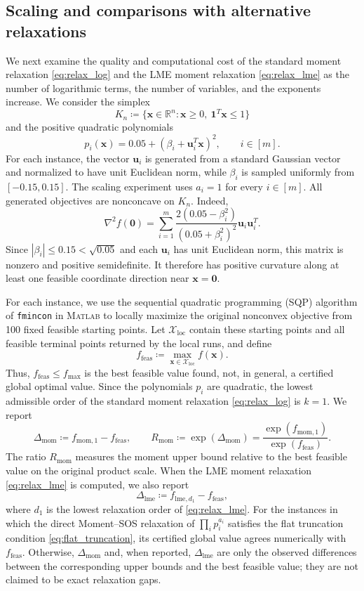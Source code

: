 \documentclass[pdflatex,sn-mathphys-num]{sn-jnl}%
\newcommand{\vect}[1]{\boldsymbol{#1}}
\theoremstyle{thmstyleone}%
\theoremstyle{thmstyletwo}%
\theoremstyle{thmstylethree}%
\begin{document}
{\color{red}
\subsection{Scaling and comparisons with alternative relaxations}
\label{sec:scaling}

We next examine the quality and computational cost of the standard
moment relaxation \eqref{eq:relax_log} and the LME moment relaxation
\eqref{eq:relax_lme} as the number of logarithmic terms, the number of
variables, and the exponents increase. We consider the simplex
\[
K_n\coloneqq\{\vect{x}\in\mathbb{R}^n:\vect{x}\geq 0,\
\mathbf{1}^T\vect{x}\leq 1\}
\]
and the positive quadratic polynomials
\[
p_i(\vect{x})=0.05+(\beta_i+\vect{u}_i^T\vect{x})^2,\qquad i\in[m].
\]
For each instance, the vector $\vect{u}_i$ is generated from a standard Gaussian
vector and normalized to have unit Euclidean norm, while
$\beta_i$ is sampled uniformly from $[-0.15,0.15]$.
The scaling experiment uses $a_i=1$ for every $i\in[m]$.
All generated objectives are nonconcave
on $K_n$. Indeed,
\[
\nabla^2 f(\vect{0})
=
\sum_{i=1}^m
\frac{2(0.05-\beta_i^2)}
{(0.05+\beta_i^2)^2}
\vect{u}_i\vect{u}_i^T.
\]
Since $|\beta_i|\leq0.15<\sqrt{0.05}$ and each $\vect{u}_i$ has unit
Euclidean norm, this matrix is nonzero and positive semidefinite.
It therefore has positive curvature along at least one feasible
coordinate direction near $\vect{x}=\vect{0}$.

For each instance, we use the sequential quadratic programming
(SQP) algorithm of \texttt{fmincon} in \textsc{Matlab} to locally
maximize the original nonconvex objective from 100 fixed feasible
starting points.
Let $\mathcal{X}_{\mathrm{loc}}$ contain these starting
points and all feasible terminal points returned by the local runs, and
define
\[
f_{\mathrm{feas}}
\coloneqq
\max_{\vect{x}\in\mathcal{X}_{\mathrm{loc}}}f(\vect{x}).
\]
Thus, $f_{\mathrm{feas}}\leq f_{\max}$ is the best feasible value found,
not, in general, a certified global optimal value.
Since the polynomials $p_i$ are quadratic, the lowest admissible
order of the standard moment relaxation \eqref{eq:relax_log} is $k=1$.
We report
\[
\Delta_{\mathrm{mom}}
\coloneqq f_{\mathrm{mom},1}-f_{\mathrm{feas}},
\qquad
R_{\mathrm{mom}}
\coloneqq
\exp(\Delta_{\mathrm{mom}})
=
\frac{\exp(f_{\mathrm{mom},1})}{\exp(f_{\mathrm{feas}})}.
\]
The ratio $R_{\mathrm{mom}}$ measures the moment upper bound relative
to the best feasible value on the original product scale.
When the LME moment relaxation \eqref{eq:relax_lme} is computed, we also report
\[
\Delta_{\mathrm{lme}}
\coloneqq
f_{\mathrm{lme},d_1}-f_{\mathrm{feas}},
\]
where $d_1$ is the lowest relaxation order of \eqref{eq:relax_lme}.
For the instances in which the direct Moment--SOS relaxation of
$\prod_i p_i^{a_i}$ satisfies the flat truncation condition
\eqref{eq:flat_truncation}, its certified global value agrees
numerically with $f_{\mathrm{feas}}$.
Otherwise, $\Delta_{\mathrm{mom}}$ and, when reported,
$\Delta_{\mathrm{lme}}$ are only the observed differences between the
corresponding upper bounds and the best feasible value; they are not
claimed to be exact relaxation gaps.

}
\end{document}
